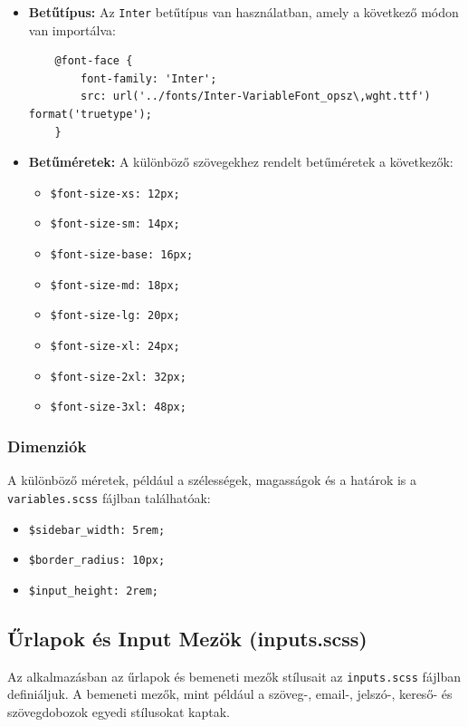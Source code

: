 \documentclass[12pt]{report}
\begin{document}
\begin{itemize}
    \item \textbf{Betűtípus:} Az \texttt{Inter} betűtípus van használatban, amely a következő módon van importálva:
    \begin{verbatim}
    @font-face {
        font-family: 'Inter';
        src: url('../fonts/Inter-VariableFont_opsz\,wght.ttf') format('truetype');
    }
    \end{verbatim}
    \item \textbf{Betűméretek:} A különböző szövegekhez rendelt betűméretek a következők:
    \begin{itemize}
        \item \texttt{\$font-size-xs: 12px;}
        \item \texttt{\$font-size-sm: 14px;}
        \item \texttt{\$font-size-base: 16px;}
        \item \texttt{\$font-size-md: 18px;}
        \item \texttt{\$font-size-lg: 20px;}
        \item \texttt{\$font-size-xl: 24px;}
        \item \texttt{\$font-size-2xl: 32px;}
        \item \texttt{\$font-size-3xl: 48px;}
    \end{itemize}
\end{itemize}

\subsubsection{Dimenziók}
A különböző méretek, például a szélességek, magasságok és a határok is a \texttt{variables.scss} fájlban találhatóak:

\begin{itemize}
    \item \texttt{\$sidebar\_width: 5rem;}
    \item \texttt{\$border\_radius: 10px;}
    \item \texttt{\$input\_height: 2rem;}
\end{itemize}

\subsection{Űrlapok és Input Mezök (inputs.scss)}

Az alkalmazásban az űrlapok és bemeneti mezők stílusait az \texttt{inputs.scss} fájlban definiáljuk. A bemeneti mezők, mint például a szöveg-, email-, jelszó-, kereső- és szövegdobozok egyedi stílusokat kaptak.
\end{document}
